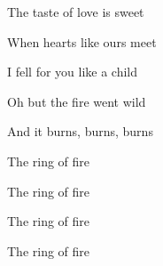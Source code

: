 \begin{song}
\bigskip

\Chorus

\bigskip

The taste  of love is sweet \par
When hearts  like ours meet \par
{}I fell for you  like a child \par
{}Oh  but the fire went wild \par

\bigskip

\Chorus {}

\bigskip

And it burns, burns, burns \par
{} The ring of fire \par
{} The ring of fire \par
{} The ring of fire \par
{} The ring of fire \par
{} \par

\end{song}
